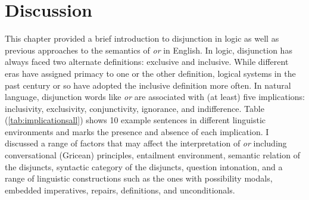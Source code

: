 \documentclass[oneside]{report}
\theoremstyle{definition}
\theoremstyle{definition}
\theoremstyle{definition}
\theoremstyle{remark}
\begin{document}
\section{Discussion}\label{discussion}

This chapter provided a brief introduction to disjunction in logic as
well as previous approaches to the semantics of \emph{or} in English. In
logic, disjunction has always faced two alternate definitions: exclusive
and inclusive. While different eras have assigned primacy to one or the
other definition, logical systems in the past century or so have adopted
the inclusive definition more often. In natural language, disjunction
words like \emph{or} are associated with (at least) five implications:
inclusivity, exclusivity, conjunctivity, ignorance, and indifference.
Table (\ref{tab:implicationsall}) shows 10 example sentences in
different linguistic environments and marks the presence and absence of
each implication. I discussed a range of factors that may affect the
interpretation of \emph{or} including conversational (Gricean)
principles, entailment environment, semantic relation of the disjuncts,
syntactic category of the disjuncts, question intonation, and a range of
linguistic constructions such as the ones with possibility modals,
embedded imperatives, repairs, definitions, and unconditionals.
\end{document}
